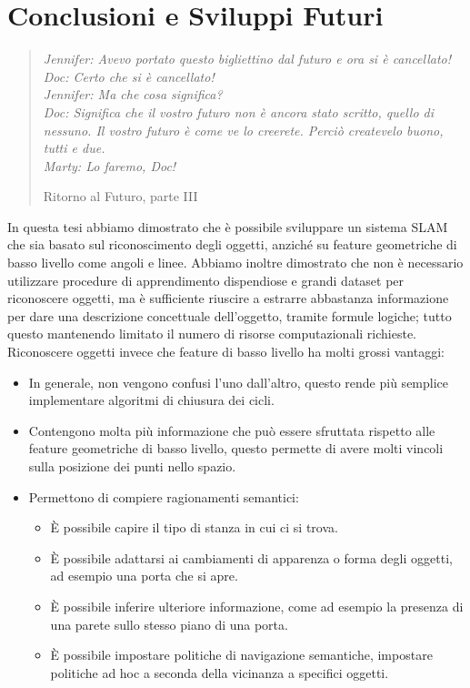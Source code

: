 \chapter{Conclusioni e Sviluppi Futuri}
\label{cap:sviluppi}
\thispagestyle{empty}

\begin{quotation}
{\footnotesize
\noindent\emph{Jennifer: Avevo portato questo bigliettino dal futuro e ora si è cancellato! \\
Doc: Certo che si è cancellato! \\
Jennifer: Ma che cosa significa? \\
Doc: Significa che il vostro futuro non è ancora stato scritto, quello di nessuno. Il vostro futuro è come ve lo creerete. Perciò createvelo buono, tutti e due. \\
Marty: Lo faremo, Doc!}
\begin{flushright}
Ritorno al Futuro, parte III
\end{flushright}
}
\end{quotation}
\vspace{0.5cm}

In questa tesi abbiamo dimostrato che è possibile sviluppare un sistema SLAM che sia basato sul riconoscimento degli oggetti, anziché su feature geometriche di basso livello come angoli e linee. Abbiamo inoltre dimostrato che non è necessario utilizzare procedure di apprendimento dispendiose e grandi dataset per riconoscere oggetti, ma è sufficiente riuscire a estrarre abbastanza informazione per dare una descrizione concettuale dell'oggetto, tramite formule logiche; tutto questo mantenendo limitato il numero di risorse computazionali richieste.
Riconoscere oggetti invece che feature di basso livello ha molti grossi vantaggi:
\begin{itemize}
 \item In generale, non vengono confusi l'uno dall'altro, questo rende più semplice implementare algoritmi di chiusura dei cicli.
 \item Contengono molta più informazione che può essere sfruttata rispetto alle feature geometriche di basso livello, questo permette di avere molti vincoli sulla posizione dei punti nello spazio.
 \item Permettono di compiere ragionamenti semantici: 
  \begin{itemize}
   \item \`E possibile capire il tipo di stanza in cui ci si trova.
   \item \`E possibile adattarsi ai cambiamenti di apparenza o forma degli oggetti, ad esempio una porta che si apre.
   \item \`E possibile inferire ulteriore informazione, come ad esempio la presenza di una parete sullo stesso piano di una porta.
   \item \`E possibile impostare politiche di navigazione semantiche, impostare politiche ad hoc a seconda della vicinanza a specifici oggetti.
  \end{itemize}
\end{itemize}

